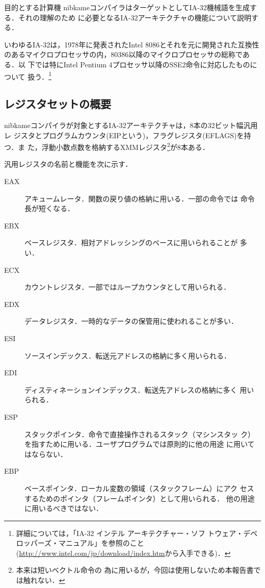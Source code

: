 \documentclass[a4paper,titlepage,report,disablejfam]{jsbook}
\begin{document}
\begin{resbonsiblesection}{目的とする計算機}{\kobori}\label{sc:target-machine}
nibkameコンパイラはターゲットとしてIA-32機械語を生成する．それの理解のため
に必要となるIA-32アーキテクチャの機能について説明する．

いわゆるIA-32は，1978年に発表されたIntel 8086とそれを元に開発された互換性
のあるマイクロプロセッサの内，80386以降のマイクロプロセッサの総称である．以
下では特にIntel Pentium 4プロセッサ以降のSSE2命令に対応したものについて
扱う．\footnote{詳細については，「IA-32 インテル アーキテクチャー・ソフ
トウェア・デベロッパーズ・マニュアル」を参照のこと
(\url{http://www.intel.com/jp/download/index.htm}から入手できる)．}


\subsection{レジスタセットの概要}\label{ssc:register_set}
nibkameコンパイラが対象とするIA-32アーキテクチャは，8本の32ビット幅汎用レ
ジスタとプログラムカウンタ(EIPという)，フラグレジスタ(EFLAGS)を持つ．ま
た，浮動小数点数を格納するXMMレジスタ\footnote{本来は短いベクトル命令の
為に用いるが，今回は使用しないため本報告書では触れない．}が8本ある．

汎用レジスタの名前と機能を次に示す．
\begin{description}
 \item[EAX] アキュームレータ．関数の戻り値の格納に用いる．一部の命令では
	    命令長が短くなる．
 \item[EBX] ベースレジスタ．相対アドレッシングのベースに用いられることが
	    多い．
 \item[ECX] カウントレジスタ．一部ではループカウンタとして用いられる．
 \item[EDX] データレジスタ．一時的なデータの保管用に使われることが多い．
 \item[ESI] ソースインデックス．転送元アドレスの格納に多く用いられる．
 \item[EDI] ディスティネーションインデックス．転送先アドレスの格納に多く
	    用いられる．
 \item[ESP] スタックポインタ．命令で直接操作されるスタック（マシンスタッ
	    ク）を指すために用いる．ユーザプログラムでは原則的に他の用途
	    に用いてはならない．
 \item[EBP] ベースポインタ．ローカル変数の領域（スタックフレーム）にアク
	    セスするためのポインタ（フレームポインタ）として用いられる．
	    他の用途に用いるべきではない． 
\end{description}


\end{resbonsiblesection}
\end{document}
